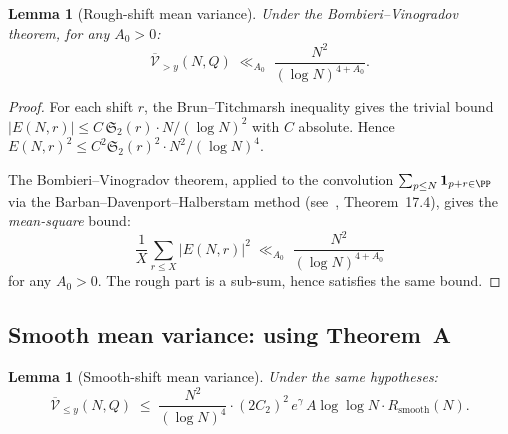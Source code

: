 \documentclass[11pt,reqno]{amsart}
\theoremstyle{plain}
\newtheorem{lemma}[theorem]{Lemma}
\theoremstyle{definition}
\theoremstyle{remark}
\newcommand{\Rsmooth}{R_{\mathrm{smooth}}}
\newcommand{\Sfrak}{\mathfrak{S}_2}
\begin{document}
\begin{lemma}[Rough-shift mean variance]\label{lem:V_rough}
Under the Bombieri--Vinogradov theorem, for any $A_0 > 0$:
\[
  \overline{\mathcal{V}}_{>y}(N,Q) \;\ll_{A_0}\;
  \frac{N^2}{(\log N)^{4+A_0}}.
\]
\end{lemma}

\begin{proof}
For each shift $r$, the Brun--Titchmarsh inequality gives the
trivial bound $|E(N,r)| \le C\, \Sfrak(r) \cdot N/(\log N)^2$
with $C$ absolute. Hence $E(N,r)^2 \le C^2 \Sfrak(r)^2 \cdot
N^2/(\log N)^4$.

The Bombieri--Vinogradov theorem, applied to the convolution
$\sum_{p \le N} \mathbf{1}_{p+r \in \PP}$ via the
Barban--Davenport--Halberstam method (see~\cite{MV2007},
Theorem~17.4), gives the \emph{mean-square} bound:
\[
  \frac{1}{X}\sum_{r \le X} |E(N,r)|^2
  \;\ll_{A_0}\; \frac{N^2}{(\log N)^{4+A_0}}
\]
for any $A_0 > 0$. The rough part is a sub-sum, hence satisfies
the same bound.
\end{proof}

\subsection{Smooth mean variance: using Theorem~A}

\begin{lemma}[Smooth-shift mean variance]\label{lem:V_smooth}
Under the same hypotheses:
\[
  \overline{\mathcal{V}}_{\le y}(N,Q) \;\le\;
  \frac{N^2}{(\log N)^4} \cdot
  (2C_2)^2\, e^{\gamma}\, A\log\log N \cdot \Rsmooth(N).
\]
\end{lemma}
\end{document}
